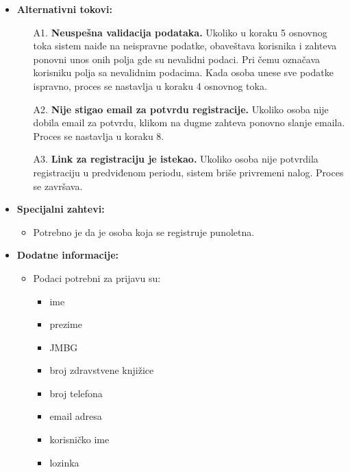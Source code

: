 \documentclass[titlepage]{article}
\begin{document}
\begin{itemize}
    \item \textbf{Alternativni tokovi:}
        \begin{itemize}
            \item[A1.] \textbf{Neuspešna validacija podataka.} Ukoliko u koraku 5 osnovnog toka sistem naiđe na neispravne podatke, obaveštava korisnika i zahteva ponovni unos onih polja gde su nevalidni podaci. Pri čemu označava korisniku polja sa nevalidnim podacima. Kada osoba unese sve podatke ispravno, proces se nastavlja u koraku 4 osnovnog toka.
            \item[A2.] \textbf{Nije stigao email za potvrdu registracije.} Ukoliko osoba nije dobila email za potvrdu, klikom na dugme zahteva ponovno slanje emaila. Proces se nastavlja u koraku 8.
	    \item[A3.] \textbf{Link za registraciju je istekao.} Ukoliko osoba nije potvrdila registraciju u predviđenom periodu, sistem briše privremeni nalog. Proces se završava.
        \end{itemize}
    
    \item \textbf{Specijalni zahtevi:}
		\begin{itemize}
			\item Potrebno je da je osoba koja se registruje punoletna.
		\end{itemize}
  
    \item \textbf{Dodatne informacije:}
        \begin{itemize}
            \item  Podaci potrebni za prijavu su:
                \begin{itemize}
                    \item ime
                    \item prezime
                    \item JMBG
                    \item broj zdravstvene knjižice
                    \item broj telefona
                    \item email adresa
		    \item korisničko ime
		    \item lozinka
                \end{itemize}
        \end{itemize}

\end{itemize}
\end{document}
